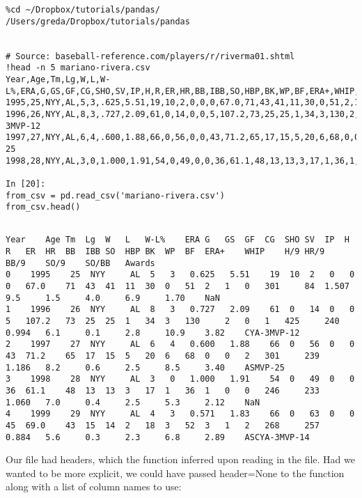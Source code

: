 \documentclass[KSmain.tex]{subfiles}
\begin{document}
\begin{framed}
\begin{verbatim}
%cd ~/Dropbox/tutorials/pandas/
/Users/greda/Dropbox/tutorials/pandas


# Source: baseball-reference.com/players/r/riverma01.shtml
!head -n 5 mariano-rivera.csv
Year,Age,Tm,Lg,W,L,W-L%,ERA,G,GS,GF,CG,SHO,SV,IP,H,R,ER,HR,BB,IBB,SO,HBP,BK,WP,BF,ERA+,WHIP,H/9,HR/9,BB/9,SO/9,SO/BB,Awards
1995,25,NYY,AL,5,3,.625,5.51,19,10,2,0,0,0,67.0,71,43,41,11,30,0,51,2,1,0,301,84,1.507,9.5,1.5,4.0,6.9,1.70,
1996,26,NYY,AL,8,3,.727,2.09,61,0,14,0,0,5,107.2,73,25,25,1,34,3,130,2,0,1,425,240,0.994,6.1,0.1,2.8,10.9,3.82,CYA-3MVP-12
1997,27,NYY,AL,6,4,.600,1.88,66,0,56,0,0,43,71.2,65,17,15,5,20,6,68,0,0,2,301,239,1.186,8.2,0.6,2.5,8.5,3.40,ASMVP-25
1998,28,NYY,AL,3,0,1.000,1.91,54,0,49,0,0,36,61.1,48,13,13,3,17,1,36,1,0,0,246,233,1.060,7.0,0.4,2.5,5.3,2.12,

In [20]:
from_csv = pd.read_csv('mariano-rivera.csv')
from_csv.head()
\end{verbatim}
\end{framed}
\begin{framed}
\begin{verbatim}

Year	Age	Tm	Lg	W	L	W-L%	ERA	G	GS	GF	CG	SHO	SV	IP	H	R	ER	HR	BB	IBB	SO	HBP	BK	WP	BF	ERA+	WHIP	H/9	HR/9	BB/9	SO/9	SO/BB	Awards
0	 1995	 25	 NYY	 AL	 5	 3	 0.625	 5.51	 19	 10	 2	 0	 0	 0	 67.0	 71	 43	 41	 11	 30	 0	 51	 2	 1	 0	 301	 84	 1.507	 9.5	 1.5	 4.0	 6.9	 1.70	 NaN
1	 1996	 26	 NYY	 AL	 8	 3	 0.727	 2.09	 61	 0	 14	 0	 0	 5	 107.2	 73	 25	 25	 1	 34	 3	 130	 2	 0	 1	 425	 240	 0.994	 6.1	 0.1	 2.8	 10.9	 3.82	 CYA-3MVP-12
2	 1997	 27	 NYY	 AL	 6	 4	 0.600	 1.88	 66	 0	 56	 0	 0	 43	 71.2	 65	 17	 15	 5	 20	 6	 68	 0	 0	 2	 301	 239	 1.186	 8.2	 0.6	 2.5	 8.5	 3.40	 ASMVP-25
3	 1998	 28	 NYY	 AL	 3	 0	 1.000	 1.91	 54	 0	 49	 0	 0	 36	 61.1	 48	 13	 13	 3	 17	 1	 36	 1	 0	 0	 246	 233	 1.060	 7.0	 0.4	 2.5	 5.3	 2.12	 NaN
4	 1999	 29	 NYY	 AL	 4	 3	 0.571	 1.83	 66	 0	 63	 0	 0	 45	 69.0	 43	 15	 14	 2	 18	 3	 52	 3	 1	 2	 268	 257	 0.884	 5.6	 0.3	 2.3	 6.8	 2.89	 ASCYA-3MVP-14
\end{verbatim}
\end{framed}

Our file had headers, which the function inferred upon reading in the file. Had we wanted to be more explicit, we could have passed header=None to the function along with a list of column names to use:
\end{document}
